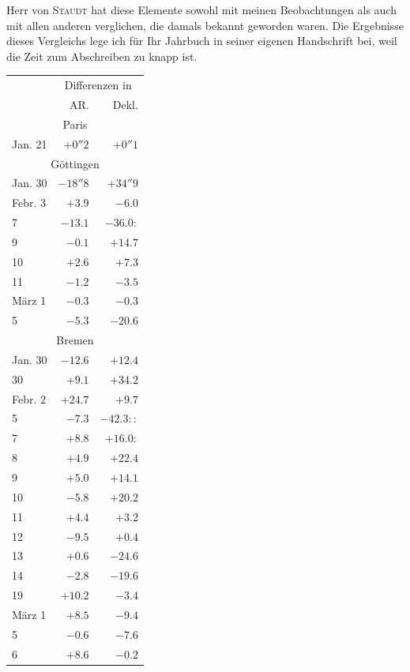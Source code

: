 Herr von \textsc{Staudt} hat diese Elemente sowohl mit meinen Beobachtungen als auch mit allen anderen verglichen, die damals bekannt geworden waren. Die Ergebnisse dieses Vergleichs lege ich für Ihr Jahrbuch in seiner eigenen Handschrift bei, weil die Zeit zum Abschreiben zu knapp ist.

\begin{center}
\begin{tabular}{l|r|r}
& \multicolumn{2}{c}{Differenzen in} \\
& AR. & Dekl. \\
\multicolumn{3}{c}{Paris} \\
Jan. 21 & $+0''2$ & $+0''1$ \\
\multicolumn{3}{c}{Göttingen} \\
Jan. 30 & $-18''8$ & $+34''9$ \\
Febr. 3 & $+3.9$ & $-6.0$ \\
7 & $-13.1$ & $-36.0\!:$ \\
9 & $-0.1$ & $+14.7$ \\
10 & $+2.6$ & $+7.3$ \\
11 & $-1.2$ & $-3.5$ \\
März 1 & $-0.3$ & $-0.3$ \\
5 & $-5.3$ & $-20.6$ \\
\multicolumn{3}{c}{Bremen} \\
Jan. 30 & $-12.6$ & $+12.4$ \\
30 & $+9.1$ & $+34.2$ \\
Febr. 2 & $+24.7$ & $+9.7$ \\
5 & $-7.3$ & $-42.3\!::$ \\
7 & $+8.8$ & $+16.0\!:$ \\
8 & $+4.9$ & $+22.4$ \\
9 & $+5.0$ & $+14.1$ \\
10 & $-5.8$ & $+20.2$ \\
11 & $+4.4$ & $+3.2$ \\
12 & $-9.5$ & $+0.4$ \\
13 & $+0.6$ & $-24.6$ \\
14 & $-2.8$ & $-19.6$ \\
19 & $+10.2$ & $-3.4$ \\
März 1 & $+8.5$ & $-9.4$ \\
5 & $-0.6$ & $-7.6$ \\
6 & $+8.6$ & $-0.2$ \\
\end{tabular}
\end{center}

